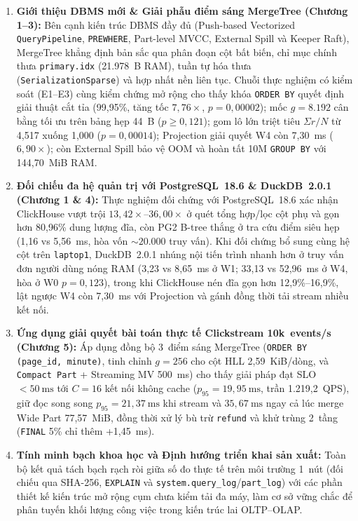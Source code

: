 \documentclass[13pt,a4paper]{report}
\begin{document}
\begin{enumerate}
    \setlength{\itemsep}{3pt}
    \setlength{\parskip}{0pt}
    \setlength{\parsep}{0pt}
    \item \textbf{Giới thiệu DBMS mới \& Giải phẫu điểm sáng MergeTree (Chương 1--3):} Bên cạnh kiến trúc DBMS đầy đủ (Push-based Vectorized \texttt{QueryPipeline}, \texttt{PREWHERE}, Part-level MVCC, External Spill và Keeper Raft), MergeTree khẳng định bản sắc qua phân đoạn cột bất biến, chỉ mục chính thưa \texttt{primary.idx} (21.978~B RAM), tuần tự hóa thưa (\texttt{SerializationSparse}) và hợp nhất nền liên tục. Chuỗi thực nghiệm có kiểm soát (E1--E3) cùng kiểm chứng mở rộng cho thấy khóa \texttt{ORDER BY} quyết định giải thuật cắt tỉa (99,95\%, tăng tốc $7{,}76{\times}$, $p = 0{,}00002$); mốc $g = 8.192$ cân bằng tối ưu trên bảng hẹp 44~B ($p \ge 0{,}121$); gom lô lớn triệt tiêu $\Sigma r / N$ từ 4,517 xuống 1,000 ($p = 0{,}00014$); Projection giải quyết W4 còn 7,30~ms ($6{,}90{\times}$); còn External Spill bảo vệ OOM và hoàn tất 10M \texttt{GROUP BY} với 144,70~MiB RAM.

    \item \textbf{Đối chiếu đa hệ quản trị với PostgreSQL~18.6 \& DuckDB~2.0.1 (Chương 1 \& 4):} Thực nghiệm đối chứng với PostgreSQL~18.6 xác nhận ClickHouse vượt trội $13{,}42{\times}\text{--}36{,}00{\times}$ ở quét tổng hợp/lọc cột phụ và gọn hơn 80,96\% dung lượng đĩa, còn PG2 B-tree thắng ở tra cứu điểm siêu hẹp (1,16 vs 5,56~ms, hòa vốn $\sim 20.000$ truy vấn). Khi đối chứng bổ sung cùng hệ cột trên \texttt{laptop1}, DuckDB~2.0.1 nhúng nội tiến trình nhanh hơn ở truy vấn đơn người dùng nóng RAM (3,23 vs 8,65~ms ở W1; 33,13 vs 52,96~ms ở W4, hòa ở W0 $p = 0{,}123$), trong khi ClickHouse nén đĩa gọn hơn 12,9\%--16,9\%, lật ngược W4 còn 7,30~ms với Projection và gánh đồng thời tải stream nhiều kết nối.

    \item \textbf{Ứng dụng giải quyết bài toán thực tế Clickstream 10k~events/s (Chương 5):} Áp dụng đồng bộ 3~điểm sáng MergeTree (\texttt{ORDER BY (page\_\allowbreak{}id, minute)}, tinh chỉnh $g = 256$ cho cột HLL 2,59~KiB/dòng, và \texttt{Compact Part} + Streaming MV 500~ms) cho thấy giải pháp đạt SLO $< 50~\text{ms}$ tới $C = 16$ kết nối không cache ($p_{95} = 19{,}95~\text{ms}$, trần 1.219,2~QPS), giữ đọc song song $p_{95} = 21{,}37~\text{ms}$ khi stream và $35{,}67~\text{ms}$ ngay cả lúc merge Wide Part 77,57~MiB, đồng thời xử lý bù trừ \texttt{refund} và khử trùng 2~tầng (\texttt{FINAL} 5\% chỉ thêm +1,45~ms).

    \item \textbf{Tính minh bạch khoa học và Định hướng triển khai sản xuất:} Toàn bộ kết quả tách bạch rạch ròi giữa số đo thực tế trên môi trường 1~nút (đối chiếu qua SHA-256, \texttt{EXPLAIN} và \texttt{system.\allowbreak{}query\_\allowbreak{}log}/\texttt{part\_\allowbreak{}log}) với các phần thiết kế kiến trúc mở rộng cụm chưa kiểm tải đa máy, làm cơ sở vững chắc để phân tuyến khối lượng công việc trong kiến trúc lai OLTP--OLAP.
\end{enumerate}
\end{document}

